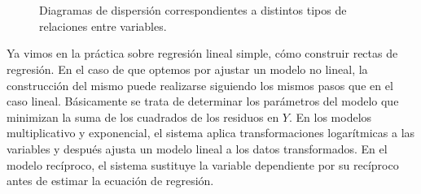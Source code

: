 \begin{figure}[h!]
\centering 
{}\qquad
{}\qquad
{}\\
\qquad
{}\qquad
{}\\
\caption{Diagramas de dispersión correspondientes a distintos tipos de relaciones
entre variables.} \label{g:tiposrelaciones2}
\end{figure}

Ya vimos en la práctica sobre regresión lineal simple, cómo construir rectas de regresión.
En el caso de que optemos por ajustar un modelo no lineal, la construcción del mismo puede realizarse siguiendo los
mismos pasos que en el caso lineal.
Básicamente se trata de determinar los parámetros del modelo que minimizan la suma de los cuadrados de los residuos en
$Y$.
En los modelos multiplicativo y exponencial, el sistema aplica transformaciones logarítmicas a las variables y después
ajusta un modelo lineal a los datos transformados.
En el modelo recíproco, el sistema sustituye la variable dependiente por su recíproco antes de estimar la ecuación de
regresión.

\clearpage
\newpage

